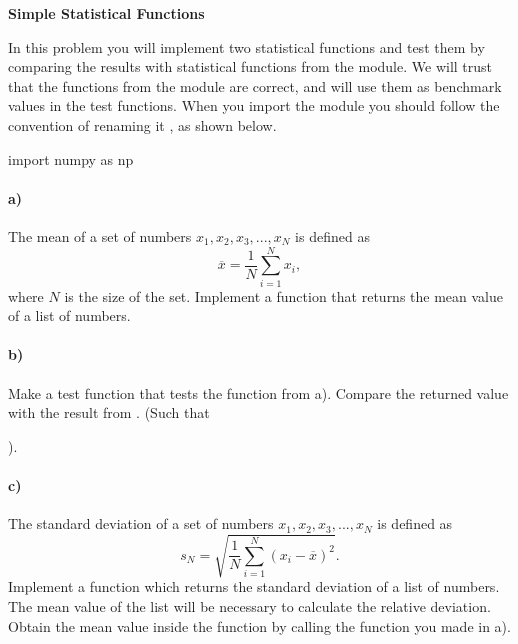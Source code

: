 \begin{Problem}{\textbf{Simple Statistical Functions}}

\noindent In this problem you will implement two statistical functions and test them by comparing the results with statistical functions from the   module. We will trust that the functions from the  module are correct, and will use them as benchmark values in the test functions. When you import the  module you should follow the convention of renaming it , as shown below.
\begin{python}
import numpy as np
\end{python}

\paragraph{a)}
The mean of a set of numbers ${x_1, x_2, x_3, ..., x_N}$ is defined as
\begin{equation*}
    \overline{x} = \frac{1}{N} \sum_{i=1}^{N} x_i ,
\end{equation*}
where $N$ is the size of the set.
Implement a function   that returns the mean value of a list of numbers.

\paragraph{b)} Make a test function  that tests the function from a). Compare the returned value with the result from . (Such that

\noindent
{}).


\paragraph{c)} The standard deviation of a set of numbers ${x_1, x_2, x_3, ..., x_N}$ is defined as
\begin{equation*}
    s_N = \sqrt{ \frac{1}{N}
        \sum_{i=1}^{N} \left(x_i - \overline{x} \right)^2} .
\end{equation*}
Implement a function  which returns the standard deviation of a list of numbers. The mean value of the list will be necessary to calculate the relative deviation. Obtain the mean value inside the   function by calling the function you made in a).


\end{Problem}
